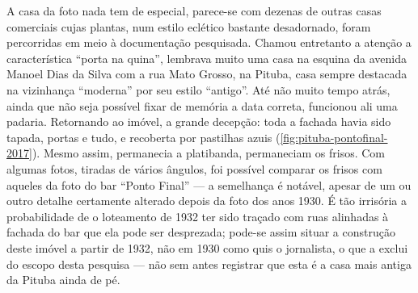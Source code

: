 A casa da foto nada tem de especial, parece-se com dezenas de outras casas comerciais cujas plantas, num estilo eclético bastante desadornado, foram percorridas em meio à documentação pesquisada. Chamou entretanto a atenção a característica ``porta na quina'', lembrava muito uma casa na esquina da avenida Manoel Dias da Silva com a rua Mato Grosso, na Pituba, casa sempre destacada na vizinhança ``moderna'' por seu estilo ``antigo''. Até não muito tempo atrás, ainda que não seja possível fixar de memória a data correta, funcionou ali uma padaria. Retornando ao imóvel, a grande decepção: toda a fachada havia sido tapada, portas e tudo, e recoberta por pastilhas azuis (\autoref{fig:pituba-pontofinal-2017}). Mesmo assim, permanecia a platibanda, permaneciam os frisos. Com algumas fotos, tiradas de vários ângulos, foi possível comparar os frisos com aqueles da foto do bar ``Ponto Final'' --- a semelhança é notável, apesar de um ou outro detalhe certamente alterado depois da foto dos anos 1930. É tão irrisória a probabilidade de o loteamento de 1932 ter sido traçado com ruas alinhadas à fachada do bar que ela pode ser desprezada; pode-se assim situar a construção deste imóvel a partir de 1932, não em 1930 como quis o jornalista, o que a exclui do escopo desta pesquisa --- não sem antes registrar que esta é a casa mais antiga da Pituba ainda de pé.


